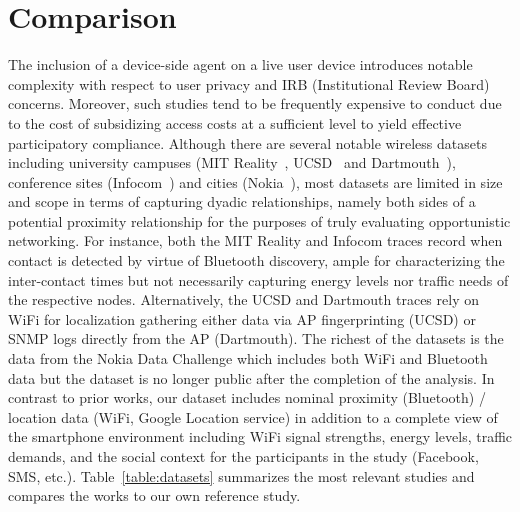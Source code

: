 \section{Comparison}
The inclusion of a device-side agent on a live user device introduces notable complexity with respect to user privacy and IRB (Institutional Review Board) concerns.  Moreover, such studies tend to be frequently expensive to conduct due to the cost of subsidizing access costs at a sufficient level to yield effective participatory compliance. Although there are several notable wireless datasets including university campuses (MIT Reality~\cite{Nathan3}, UCSD~\cite{mcnett2005access} and Dartmouth~\cite{henderson2004changing}), conference sites (Infocom~\cite{chaintreau2007impact}) and cities (Nokia~\cite{laurila2012mobile}), most datasets are limited in size and scope in terms of capturing dyadic relationships, namely both sides of a potential proximity relationship for the purposes of truly evaluating opportunistic networking.  For instance, both the MIT Reality and Infocom traces record when contact is detected by virtue of Bluetooth discovery, ample for characterizing the inter-contact times but not necessarily capturing energy levels nor traffic needs of the respective nodes.  Alternatively, the UCSD and Dartmouth traces rely on WiFi for localization gathering either data via AP fingerprinting (UCSD) or SNMP logs directly from the AP (Dartmouth).  The richest of the datasets is the data from the Nokia Data Challenge which includes both WiFi and Bluetooth data but the dataset is no longer public after the completion of the analysis.  In contrast to prior works, our dataset includes nominal proximity (Bluetooth) / location data (WiFi, Google Location service) in addition to a complete view of the smartphone environment including WiFi signal strengths, energy levels, traffic demands, and the social context for the participants in the study (Facebook, SMS, etc.).  Table~\ref{table:datasets} summarizes the most relevant studies and compares the works to our own reference study.  

